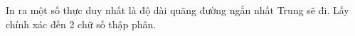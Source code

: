 In ra một số thực duy nhất là độ dài quãng đường ngắn nhất Trung sẽ đi. Lấy chính xác đến 2 chữ số thập phân.

\